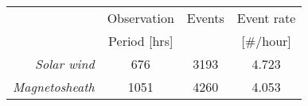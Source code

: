 
\begin{tabular}{rccc}
\hline
 & Observation         & Events &  Event rate \\
 & Period [hrs]        &        &  [\#/hour]  \\
\hline
\textit{Solar wind}     & 676   &  3193 & 4.723 \\
\textit{Magnetosheath}  & 1051  &  4260 & 4.053 \\
\hline
\end{tabular}